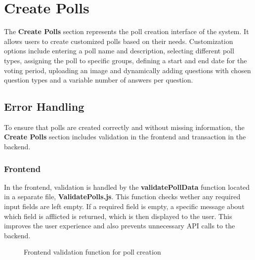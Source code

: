 \documentclass[a4paper,12pt]{report}
\begin{document}
\section{Create Polls}
The \textbf{Create Polls} section represents the poll creation interface of the system. It allows users to create customized polls based on their needs. Customization options include entering a poll name and description, selecting different poll types, assigning the poll to specific groups, defining a start and end date for the voting period, uploading an image and dynamically adding questions with chosen question types and a variable number of answers per question.
\subsection{Error Handling}
To ensure that polls are created correctly and without missing information, the \textbf{Create Polls} section includes validation in the frontend and transaction in the backend.
\subsubsection{Frontend}
In the frontend, validation is handled by the \textbf{validatePollData} function located in a separate file, \textbf{ValidatePolls.js}. This function checks wether any required input fields are left empty. If a required field is empty, a specific message about which field is afflicted is returned, which is then displayed to the user. This improves the user experience and also prevents unnecessary API calls to the backend.
\begin{figure}[H]
	\caption{Frontend validation function for poll creation}
	\label{fig:validate-poll-data}
\end{figure}
\end{document}
